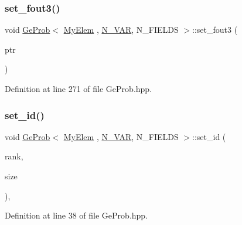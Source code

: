 \subsubsection{\texorpdfstring{set\+\_\+fout3()}{set\_fout3()}}
{\footnotesize\ttfamily void \hyperlink{classGeProb}{Ge\+Prob}$<$ \hyperlink{DG__Prob_8h_a83cd887ced9a6587428f267e50cd4787}{My\+Elem} , \hyperlink{classED__Prob_a4e7d2ff1a8e435e336fb00c527224b5a}{N\+\_\+\+V\+AR}, N\+\_\+\+F\+I\+E\+L\+DS $>$\+::set\+\_\+fout3 (\begin{DoxyParamCaption}\item[{F\+I\+LE $\ast$}]{ptr }\end{DoxyParamCaption})\hspace{0.3cm}{\ttfamily [inherited]}}



Definition at line 271 of file Ge\+Prob.\+hpp.

\mbox{\label{classGeProb_ae922c4a2ec2974c44cbcfa02e56855db}} 
\subsubsection{\texorpdfstring{set\+\_\+id()}{set\_id()}}
{\footnotesize\ttfamily void \hyperlink{classGeProb}{Ge\+Prob}$<$ \hyperlink{DG__Prob_8h_a83cd887ced9a6587428f267e50cd4787}{My\+Elem} , \hyperlink{classED__Prob_a4e7d2ff1a8e435e336fb00c527224b5a}{N\+\_\+\+V\+AR}, N\+\_\+\+F\+I\+E\+L\+DS $>$\+::set\+\_\+id (\begin{DoxyParamCaption}\item[{const int}]{rank,  }\item[{const int}]{size }\end{DoxyParamCaption})\hspace{0.3cm}{\ttfamily [inline]}, {\ttfamily [inherited]}}



Definition at line 38 of file Ge\+Prob.\+hpp.



